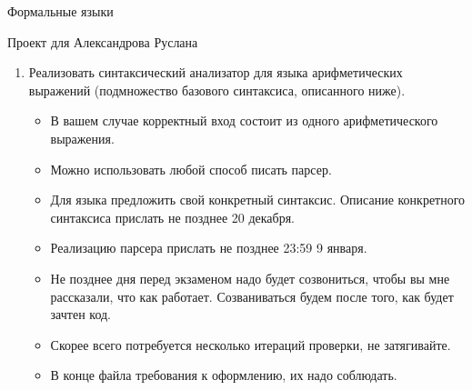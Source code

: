 \documentclass[12pt]{article}
\begin{document}
\begin{center}
{\LARGE Формальные языки}

{\Large Проект для Александрова Руслана}

\end{center}

\bigskip

\begin{enumerate}
  \item {Реализовать синтаксический анализатор для языка арифметических выражений (подмножество базового синтаксиса, описанного ниже). }
  \begin{itemize}
    \item В вашем случае корректный вход состоит из одного арифметического выражения.
    \item Можно использовать любой способ писать парсер.
    \item Для языка предложить свой конкретный синтаксис. Описание конкретного синтаксиса прислать не позднее 20 декабря.
    \item Реализацию парсера прислать не позднее 23:59 9 января.
    \item Не позднее дня перед экзаменом надо будет созвониться, чтобы вы мне рассказали, что как работает. Созваниваться будем после того, как будет зачтен код.
    \item Скорее всего потребуется несколько итераций проверки, не затягивайте.
    \item В конце файла требования к оформлению, их надо соблюдать.
  \end{itemize}

\end{enumerate}



\bigskip


\end{document}
